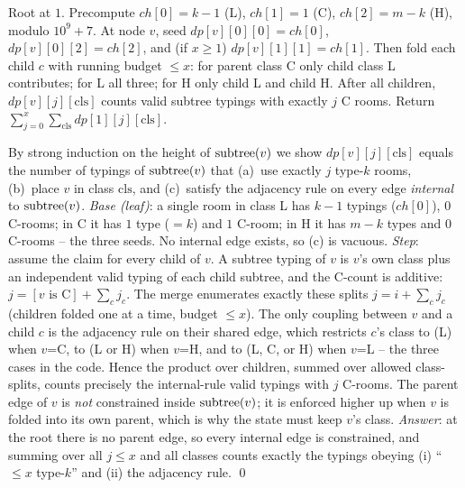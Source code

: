 Root at $1$. Precompute $\mathit{ch}[0]=k-1$ (L), $\mathit{ch}[1]=1$ (C),
$\mathit{ch}[2]=m-k$ (H), modulo $10^9+7$. At node $v$, seed
$\mathit{dp}[v][0][0]=\mathit{ch}[0]$, $\mathit{dp}[v][0][2]=\mathit{ch}[2]$,
and (if $x\ge1$) $\mathit{dp}[v][1][1]=\mathit{ch}[1]$. Then fold each child
$c$ with running budget $\le x$: for parent class C only child class L
contributes; for L all three; for H only child L and child H. After all children,
$\mathit{dp}[v][j][\text{cls}]$ counts valid subtree typings with exactly $j$
C rooms. Return $\sum_{j=0}^{x}\sum_{\text{cls}} \mathit{dp}[1][j][\text{cls}]$.

\begin{proofbox}
By strong induction on the height of $\operatorname{subtree}(v)$ we show $\mathit{dp}[v][j][\text{cls}]$
equals the number of typings of $\operatorname{subtree}(v)$ that (a)~use exactly $j$ type-$k$
rooms, (b)~place $v$ in class $\text{cls}$, and (c)~satisfy the adjacency rule on
every edge \emph{internal} to $\operatorname{subtree}(v)$. \emph{Base (leaf)}: a single room in
class L has $k-1$ typings ($\mathit{ch}[0]$), $0$ C-rooms; in C it has $1$
type ($=k$) and $1$ C-room; in H it has $m-k$ types and $0$ C-rooms -- the three
seeds. No internal edge exists, so (c) is vacuous. \emph{Step}: assume the
claim for every child of $v$. A subtree typing of $v$ is $v$'s own class plus an
independent valid typing of each child subtree, and the C-count is additive:
$j = [\text{$v$ is C}] + \sum_c j_c$. The merge enumerates exactly these
splits $j = i + \sum_c j_c$ (children folded one at a time, budget $\le x$). The
only coupling between $v$ and a child $c$ is the adjacency rule on their shared
edge, which restricts $c$'s class to (L) when $v$=C, to (L or H) when $v$=H, and
to (L, C, or H) when $v$=L -- the three cases in the code. Hence the product over
children, summed over allowed class-splits, counts precisely the internal-rule
valid typings with $j$ C-rooms. The parent edge of $v$ is \emph{not} constrained
inside $\operatorname{subtree}(v)$; it is enforced higher up when $v$ is folded into its own
parent, which is why the state must keep $v$'s class. \emph{Answer}: at the root
there is no parent edge, so every internal edge is constrained, and summing over
all $j\le x$ and all classes counts exactly the typings obeying (i) ``$\le x$
type-$k$'' and (ii) the adjacency rule. \qed
\end{proofbox}

